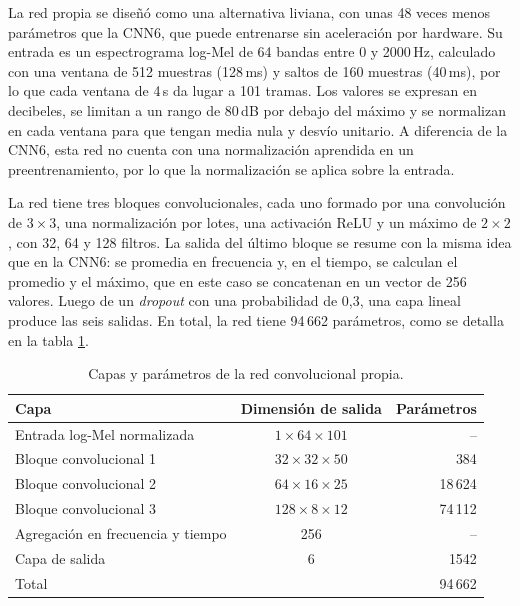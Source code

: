 La red propia se diseñó como una alternativa liviana, con unas 48 veces menos parámetros que la
CNN6, que puede entrenarse sin aceleración por hardware. Su entrada es un espectrograma log-Mel de
64 bandas entre 0 y 2000\,Hz, calculado con una ventana de 512 muestras (128\,ms) y saltos de 160
muestras (40\,ms), por lo que cada ventana de 4\,s da lugar a 101 tramas. Los valores se expresan
en decibeles, se limitan a un rango de 80\,dB por debajo del máximo y se normalizan en cada
ventana para que tengan media nula y desvío unitario. A diferencia de la CNN6, esta red no cuenta
con una normalización aprendida en un preentrenamiento, por lo que la normalización se aplica sobre
la entrada.

La red tiene tres bloques convolucionales, cada uno formado por una convolución de $3 \times 3$,
una normalización por lotes, una activación ReLU y un máximo de $2 \times 2$, con 32, 64 y 128
filtros. La salida del último bloque se resume con la misma idea que en la CNN6: se promedia en
frecuencia y, en el tiempo, se calculan el promedio y el máximo, que en este caso se concatenan en
un vector de 256 valores. Luego de un \textit{dropout} con una probabilidad de 0,3, una capa lineal
produce las seis salidas. En total, la red tiene 94\,662 parámetros, como se detalla en la tabla
\ref{tab:capasPropia}.

\begin{table}[htbp]
	\centering
	\caption[Capas y parámetros de la red convolucional propia]{Capas y parámetros de la red
		convolucional propia.}
	\label{tab:capasPropia}
	\small
	\begin{tabular}{l c r}
		\toprule
		\textbf{Capa} & \textbf{Dimensión de salida} & \textbf{Parámetros} \\
		\midrule
		Entrada log-Mel normalizada & $1 \times 64 \times 101$ & -- \\
		Bloque convolucional 1 & $32 \times 32 \times 50$ & 384 \\
		Bloque convolucional 2 & $64 \times 16 \times 25$ & 18\,624 \\
		Bloque convolucional 3 & $128 \times 8 \times 12$ & 74\,112 \\
		Agregación en frecuencia y tiempo & 256 & -- \\
		Capa de salida & 6 & 1542 \\
		Total & & 94\,662 \\
		\bottomrule
	\end{tabular}
\end{table}

